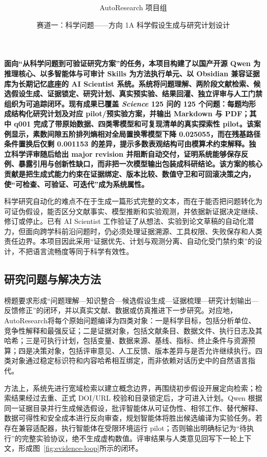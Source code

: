\documentclass[12pt]{article}
\date{}
\title{\bfseries \boldmath \scititle}
\author{
	AutoResearch 项目组\and
	\small 赛道一：科学问题——方向 1A 科学假设生成与研究计划设计
}
\renewenvironment{abstract}
	{\quotation}
	{\endquotation}
\newcommand{\systemname}{AutoResearch}
\newcommand{\sciencequestions}{\textit{Science} 125 问}
\begin{document}
\maketitle

\begin{abstract} \bfseries \boldmath
面向“从科学问题到可验证研究方案”的任务，本项目构建了以国产开源 Qwen 为推理核心、以多智能体与可审计 Skills 为方法执行单元、以 Obsidian 兼容证据库为长期记忆底座的 AI Scientist 系统。系统将问题理解、两阶段文献检索、候选假设生成、证据锁定、研究计划、真实预实验、结果回灌、独立评审与人工门禁组织为可追踪闭环。现有成果已覆盖 \sciencequestions 的 125 个问题：每题均形成结构化研究计划及对应 pilot/预实验方案，并输出 Markdown 与 PDF；其中 q001 完成了带原始数据、四类零模型和可复现清单的真实探索性 pilot。该案例显示，素数间隙五阶排列熵相对全局置换零模型下降 0.025055，而在残基路径条件置换后仅剩 0.001153 的差异，提示多数表观结构可由模算术约束解释。独立科学评审随后给出 major revision 并阻断自动交付，证明系统能够保存反例、暴露引用与创新性缺口，而非把一次模型输出包装成科研结论。该方案的核心贡献是把生成式能力约束在证据绑定、版本比较、数值守卫和可回滚决策之内，使“可检查、可验证、可迭代”成为系统属性。
\end{abstract}

\noindent
科学研究自动化的难点不在于生成一篇形式完整的文本，而在于能否把问题转化为可证伪假设，能否区分文献事实、模型推断和实验观测，并依据新证据决定继续、修订或停止。已有 AI Scientist 工作验证了从想法、实验到论文草稿的自动化潜力\cite{aiscientist,aiscientist2}，但面向跨学科前沿问题时，仍必须处理证据溯源、工具权限、失败保存和人类责任边界。本项目因此采用“证据优先、计划与观测分离、自动化受门禁约束”的设计，不把语言流畅度等同于科学有效性。

\subsection*{研究问题与解决方法}

榜题要求形成“问题理解—知识整合—候选假设生成—证据梳理—研究计划输出—反馈修正”的闭环，并以真实文献、数据或仿真推进下一步研究。对应地，\systemname 将每个原始问题编译为四类对象：一是科学目标，包括分析单位、竞争性解释和最强反证；二是证据对象，包括文献条目、数据文件、执行日志及其哈希；三是可执行计划，包括变量、数据来源、基线、指标、终止条件与资源预算；四是决策对象，包括评审意见、人工反馈、版本差异与是否允许继续执行。四类对象通过稳定标识符和内容哈希相互绑定，而非依赖对话历史中的自然语言指代。

方法上，系统先进行宽域检索以建立概念边界，再围绕初步假设开展定向检索；检索结果经过去重、正式 DOI/URL 校验和目录锁定后，才可进入计划。Qwen 根据同一证据目录并行生成候选假设，批评智能体从可证伪性、相邻工作、替代解释、数据可得性和安全成本进行反向审查，规划智能体将胜出候选编译为实验任务。若存在兼容适配器，执行智能体在受限环境运行 pilot；否则输出明确标记为“待执行”的完整实验协议，绝不生成虚构数值。评审结果与人类意见回写下一轮上下文，形成图~\ref{fig:evidence-loop}所示的闭环。
\end{document}
